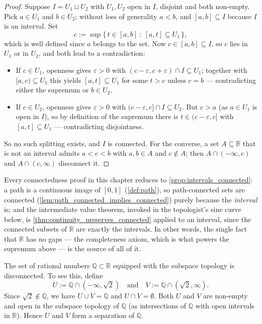 \begin{proof}
Suppose $I = U_1 \sqcup U_2$ with $U_1, U_2$ open in $I$, disjoint and both non-empty. Pick
$a \in U_1$ and $b \in U_2$; without loss of generality $a<b$, and $[a,b] \subseteq I$ because
$I$ is an interval. Set
\[c := \sup\{\,t \in [a,b] \ :\ [a,t] \subseteq U_1\,\},\]
which is well defined since $a$ belongs to the set. Now $c \in [a,b] \subseteq I$, so $c$ lies
in $U_1$ or in $U_2$, and both lead to a contradiction:
\begin{itemize}
  \item If $c \in U_1$, openness gives $\varepsilon>0$ with $(c-\varepsilon,c+\varepsilon)\cap I
    \subseteq U_1$; together with $[a,c) \subseteq U_1$ this yields $[a,t] \subseteq U_1$ for
    some $t>c$ unless $c=b$ --- contradicting either the supremum or $b \in U_2$.
  \item If $c \in U_2$, openness gives $\varepsilon>0$ with $(c-\varepsilon,c] \cap I \subseteq
    U_2$. But $c>a$ (as $a \in U_1$ is open in $I$), so by definition of the supremum there is
    $t \in (c-\varepsilon,c]$ with $[a,t] \subseteq U_1$ --- contradicting disjointness.
\end{itemize}
So no such splitting exists, and $I$ is connected. For the converse, a set $A \subseteq
\mathbb{R}$ that is not an interval admits $a<c<b$ with $a,b \in A$ and $c \notin A$; then
$A \cap (-\infty,c)$ and $A \cap (c,\infty)$ disconnect it.
\end{proof}

\begin{remark}
\label{rem:intervals_are_the_base_case}
Every connectedness proof in this chapter reduces to \cref{prop:intervals_connected}: a path is
a continuous image of $[0,1]$ (\cref{def:path}), so path-connected sets are connected
(\cref{lem:path_connected_implies_connected}) purely because the \emph{interval} is; and the
intermediate value theorem, invoked in the topologist's sine curve below, is
\cref{thm:continuity_preserves_connected} applied to an interval, since the connected subsets of
$\mathbb{R}$ are exactly the intervals. In other words, the single fact that $\mathbb{R}$ has no
gaps --- the completeness axiom, which is what powers the supremum above --- is the source of
all of it.
\end{remark}

\begin{aiexample}
The set of rational numbers $\mathbb{Q} \subset \mathbb{R}$ equipped with the subspace topology is disconnected. To see this, define
\[
U := \mathbb{Q} \cap (-\infty, \sqrt{2}) \quad \text{and} \quad V := \mathbb{Q} \cap (\sqrt{2}, \infty).
\]
Since $\sqrt{2} \notin \mathbb{Q}$, we have $U \cup V = \mathbb{Q}$ and $U \cap V = \emptyset$. Both $U$ and $V$ are non-empty and open in the subspace topology of $\mathbb{Q}$ (as intersections of $\mathbb{Q}$ with open intervals in $\mathbb{R}$). Hence $U$ and $V$ form a separation of $\mathbb{Q}$.
\end{aiexample}

